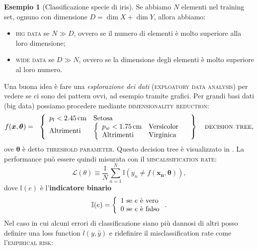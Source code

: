 \documentclass[10pt]{article}
\renewcommand{\vec}[1]{\boldsymbol{#1}}
\newcommand{\im}[1]{\textsc{#1}}
\theoremstyle{definition}
\newtheorem{example}{Esempio}[section]
\begin{document}
\begin{example}[Classificazione specie di iris]
Se abbiamo $N$ elementi nel training set, ognuno con dimensione $D = \dim{X} + \dim{Y}$, allora abbiamo:
\begin{itemize}
\item \im{big data} se $N\gg D$, ovvero se il numero di elementi è molto superiore alla loro dimensione;
\item \im{wide data} se $D\gg N$, ovvero se la dimensione degli elementi è molto superiore al loro numero.
\end{itemize}

Una buona idea è fare una \textit{esplorazione dei dati} (\im{exploatory data analysis}) per vedere se ci sono dei pattern ovvi, ad esempio tramite grafici. Per grandi basi dati (big data) possiamo procedere mediante \im{dimensionality reduction}:
\begin{equation}
f(\vec{x}, \vec{\theta}) = \left.\begin{array}{l}
\left\{\begin{array}{ll}
p_l < \qty{2.45}{cm} & \text{Setosa} \\
\text{Altrimenti} & \left\{\begin{array}{ll}
p_w < \qty{1.75}{cm} & \text{Versicolor} \\
\text{Altrimenti} & \text{Virginica} \\
\end{array}\right.
\end{array}\right.
\end{array}\right\} \quad\text{\im{decision tree}},
\end{equation}
ove $\vec{\theta}$ è detto \im{threshold parameter}. Questo decision tree è visualizzato in . La performance può essere quindi misurata con il \im{miscalssification rate}:
\begin{equation}\label{eq:misclassification-rate-simple}
\mathcal{L}(\theta) \equiv \frac{1}{N}\sum_{n=1}^N \mathbb{I}\left( y_n \neq f(\vec{x_n}, \vec{\theta}) \right),
\end{equation}
dove $\mathbb{I}(e)$ è l'\textbf{indicatore binario}
\begin{equation}\label{eq:indicatore-binario}
\mathbb{I}(e) = \left\{\begin{array}{l@{\text{ se } e \text{ è }}l}
1 & \text{vero} \\
0 & \text{falso} \\
\end{array}\right..
\end{equation}
Nel caso in cui alcuni errori di classificazione siano più dannosi di altri posso definire una loss function $l(y, \hat{y})$ e ridefinire il misclassification rate come l'\im{empirical risk}:

\end{example}
\end{document}
